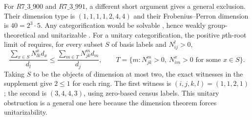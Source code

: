 \documentclass[11pt]{article}
\begin{document}
For $R7\_3\_900$ and $R7\_3\_991$, a different short argument gives a
general exclusion. Their dimension type is $(1,1,1,1,2,4,4)$ and their
Frobenius--Perron dimension is $40=2^3\cdot5$. Any categorification would
be solvable \cite[Theorem~1.6]{ENOSolvable}, hence weakly group-theoretical
and unitarizable \cite[Theorem~5.20]{GHR}.
For a unitary categorification, the positive $p$th-root limit of
\cite[Corollary~3.4]{Lim} requires, for every subset $S$ of basis labels
and $N_{ij}^l>0$,
\[
 \frac{\sum_{x\in S}N_{lk}^x d_x}{d_l}
 \leq \frac{\sum_{m\in T}N_{jk}^m d_m}{d_j},
 \qquad
 T=\{m:N_{jk}^m>0,\ N_{im}^x>0\text{ for some }x\in S\}.
\]
Taking $S$ to be the objects of dimension at most two, the exact
witnesses in the supplement give $2\leq1$ for each ring. The first
witness is $(i,j,k,l)=(1,1,2,1)$; the second is $(3,4,4,3)$, using
zero-based census labels. This unitary obstruction is a general one
here because the dimension theorem forces unitarizability.
\end{document}
